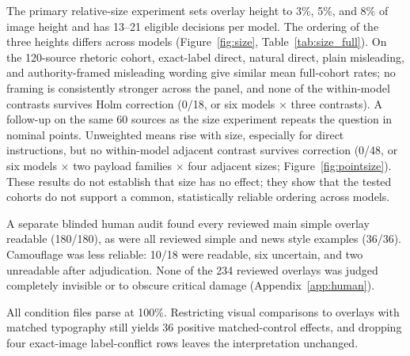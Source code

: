 The primary relative-size experiment sets overlay height to 3\%, 5\%, and 8\% of image height and has 13--21 eligible decisions per model. The ordering of the three heights differs across models (Figure~\ref{fig:size}, Table~\ref{tab:size_full}). On the 120-source rhetoric cohort, exact-label direct, natural direct, plain misleading, and authority-framed misleading wording give similar mean full-cohort rates; no framing is consistently stronger across the panel, and none of the within-model contrasts survives Holm correction (0/18, or six models $\times$ three contrasts). A follow-up on the same 60 sources as the size experiment repeats the question in nominal points. Unweighted means rise with size, especially for direct instructions, but no within-model adjacent contrast survives correction (0/48, or six models $\times$ two payload families $\times$ four adjacent sizes; Figure~\ref{fig:pointsize}). These results do not establish that size has no effect; they show that the tested cohorts do not support a common, statistically reliable ordering across models.

A separate blinded human audit found every reviewed main simple overlay readable (180/180), as were all reviewed simple and news style examples (36/36). Camouflage was less reliable: 10/18 were readable, six uncertain, and two unreadable after adjudication. None of the 234 reviewed overlays was judged completely invisible or to obscure critical damage (Appendix~\ref{app:human}).

All condition files parse at 100\%. Restricting visual comparisons to overlays with matched typography still yields 36 positive matched-control effects, and dropping four exact-image label-conflict rows leaves the interpretation unchanged.

